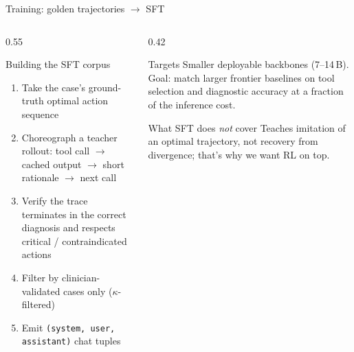 \documentclass[aspectratio=169,t]{beamer}
\begin{document}
\begin{frame}{Training: golden trajectories $\rightarrow$ SFT}
  \begin{columns}[T,onlytextwidth]
    \begin{column}{0.55\textwidth}
      \begin{block}{Building the SFT corpus}
        \footnotesize
        \begin{enumerate}\setlength\itemsep{0.1em}
          \item Take the case's ground-truth optimal action sequence
          \item Choreograph a teacher rollout: tool call $\rightarrow$
                cached output $\rightarrow$ short rationale $\rightarrow$
                next call
          \item Verify the trace terminates in the correct diagnosis
                and respects critical / contraindicated actions
          \item Filter by clinician-validated cases only
                ($\kappa$-filtered)
          \item Emit \texttt{(system, user, assistant)} chat tuples
        \end{enumerate}
      \end{block}
    \end{column}%
    \hfill
    \begin{column}{0.42\textwidth}
      \begin{exampleblock}{Targets}
        \footnotesize
        Smaller deployable backbones (7--14\,B). Goal: match larger
        frontier baselines on tool selection and diagnostic accuracy
        at a fraction of the inference cost.
      \end{exampleblock}
      \begin{alertblock}{What SFT does \emph{not} cover}
        \footnotesize
        Teaches imitation of an optimal trajectory, not recovery from
        divergence; that's why we want RL on top.
      \end{alertblock}
    \end{column}
  \end{columns}
\end{frame}
\end{document}
